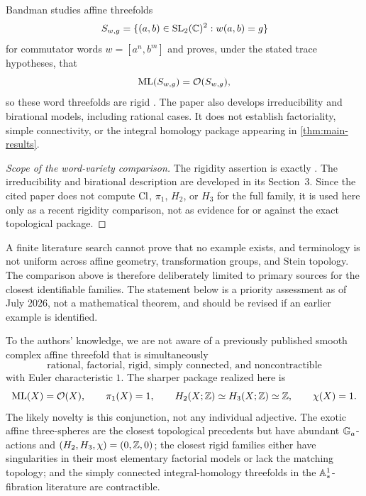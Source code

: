 \begin{historicalnote}\label{hist:word-threefolds}
Bandman studies affine threefolds
\[
  S_{w,g}=\{(a,b)\in \operatorname{SL}_2(\mathbb C)^2:w(a,b)=g\}
\]
for commutator words $w=[a^n,b^m]$ and proves, under the stated trace hypotheses, that
\[
  \operatorname{ML}(S_{w,g})=\mathcal O(S_{w,g}),
\]
so these word threefolds are rigid \cite[Theorem~4.3]{Bandman2026Word}.  The paper also develops irreducibility and birational models, including rational cases.  It does not establish factoriality, simple connectivity, or the integral homology package appearing in \cref{thm:main-results}.
\end{historicalnote}

\begin{proof}[Scope of the word-variety comparison]
The rigidity assertion is exactly \cite[Theorem~4.3]{Bandman2026Word}.  The irreducibility and birational description are developed in its Section~3.  Since the cited paper does not compute $\operatorname{Cl}$, $\pi_1$, $H_2$, or $H_3$ for the full family, it is used here only as a recent rigidity comparison, not as evidence for or against the exact topological package.
\end{proof}

\begin{warning}\label{warn:priority-scope}
A finite literature search cannot prove that no example exists, and terminology is not uniform across affine geometry, transformation groups, and Stein topology.  The comparison above is therefore deliberately limited to primary sources for the closest identifiable families.  The statement below is a priority assessment as of July 2026, not a mathematical theorem, and should be revised if an earlier example is identified.
\end{warning}

\begin{observation}\label{obs:cautious-priority}
To the authors' knowledge, we are not aware of a previously published smooth complex affine threefold that is simultaneously
\[
  \text{rational, factorial, rigid, simply connected, and noncontractible}
\]
with Euler characteristic $1$.  The sharper package realized here is
\[
  \operatorname{ML}(X)=\mathcal O(X),
  \qquad
  \pi_1(X)=1,
  \qquad
  H_2(X;\mathbb Z)\simeq H_3(X;\mathbb Z)\simeq\mathbb Z,
  \qquad
  \chi(X)=1.
\]
The likely novelty is this conjunction, not any individual adjective.  The exotic affine three-spheres are the closest topological precedents but have abundant $\mathbb G_a$-actions and $(H_2,H_3,\chi)=(0,\mathbb Z,0)$; the closest rigid families either have singularities in their most elementary factorial models or lack the matching topology; and the simply connected integral-homology threefolds in the $\mathbb A^1_*$-fibration literature are contractible.
\end{observation}

